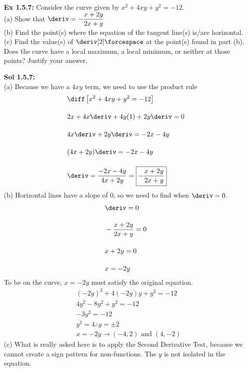 \begin{tcolorbox}[example]
    \textbf{Ex 1.5.7: } Consider the curve given by $x^2 + 4xy + y^2 = -12$. \\[11pt]

    (a) Show that $\deriv = -\dfrac{x + 2y}{2x + y}$ \\[11pt]
    (b) Find the point(s) where the equation of the tangent line(s) is/are horizontal. \\[11pt]
    (c) Find the value(s) of $\deriv[2] \forcespace$ at the point(s) found in part (b). Does the curve have a local maximum, a local minimum, or neither at those points? Justify your answer.
\end{tcolorbox} 
\begin{tcolorbox}[solution]
    \textbf{Sol 1.5.7: } \\[11pt]
    (a) Because we have a $4xy$ term, we need to use the product rule \begin{align*}
        & \diff \left[x^2 + 4xy + y^2 = -12\right] \\[11pt]
        & 2x + 4x\deriv + 4y(1) + 2y\deriv = 0 \\[11pt]
        & 4x\deriv+ 2y\deriv = -2x - 4y \\[11pt]
        & (4x + 2y)\deriv = -2x - 4y \\[11pt]
        & \deriv = \dfrac{-2x - 4y}{4x + 2y} = \boxed{-\dfrac{x + 2y}{2x + y}}
    \end{align*}
    (b) Horizontal lines have a slope of $0$, so we need to find when $\deriv = 0$. \begin{align*}
        & \deriv = 0 \\[11pt]
        & -\dfrac{x + 2y}{2x + y} = 0 \\[11pt]
        & x + 2y = 0 \\[11pt]
        & x = -2y
    \end{align*}
    To be on the curve, $x = -2y$ must satisfy the original equation. \begin{align*}
        & (-2y)^2 + 4(-2y)y + y^2 = -12 \\[11pt]
        & 4y^2 - 8y^2 + y^2 = -12 \\[11pt]
        & -3y^2 = -12 \\[11pt]
        & y^2 = 4 \therefore y = \pm 2 \\[11pt]
        & x = -2y \rightarrow \boxed{(-4, 2) \text{ and } (4, -2)}
    \end{align*}
    (c) What is really asked here is to apply the Second Derivative Test, because we cannot create a sign pattern for non-functions. The $y$ is not isolated in the equation. \begin{align*}

\end{align*}
\end{tcolorbox}
